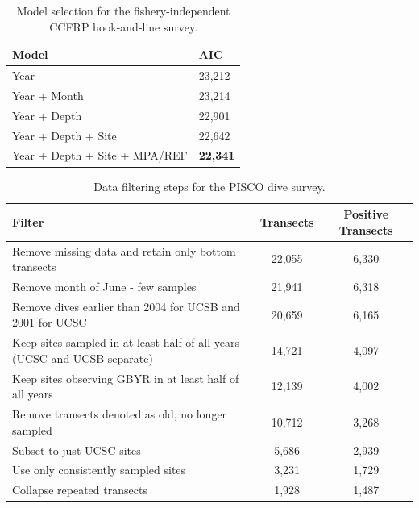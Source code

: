 \documentclass[12pt,]{article}
\begin{document}
\vspace{3cm}

\begin{table}[ht]
\centering
\caption{Model selection for the fishery-independent CCFRP hook-and-line survey.} 
\label{tab:Fleet9_AIC}
\begin{tabular}{ll}
  \hline
Model & AIC \\ 
  \hline
Year & 23,212 \\ 
  Year + Month & 23,214 \\ 
  Year + Depth & 22,901 \\ 
  Year + Depth + Site & 22,642 \\ 
  Year + Depth + Site + MPA/REF & \textbf{22,341} \\ 
   \hline
\end{tabular}
\end{table}

\FloatBarrier

\vspace{3cm}

\begin{table}[ht]
\centering
\caption{Data filtering steps for the PISCO dive survey.} 
\label{tab:Fleet8_Filter}
\begin{tabular}{>{\raggedright}p{4in}cc}
  \hline
Filter & Transects & Positive Transects \\ 
  \hline
Remove missing data and retain only bottom transects & 22,055 & 6,330 \\ 
  Remove month of  June - few samples & 21,941 & 6,318 \\ 
  Remove dives earlier than 2004 for UCSB and 2001 for UCSC & 20,659 & 6,165 \\ 
  Keep sites sampled in at least half of all years (UCSC and UCSB separate) & 14,721 & 4,097 \\ 
  Keep sites observing GBYR in at least half of all years & 12,139 & 4,002 \\ 
  Remove transects denoted as old, no longer sampled & 10,712 & 3,268 \\ 
  Subset to just UCSC sites & 5,686 & 2,939 \\ 
  Use only consistently sampled sites & 3,231 & 1,729 \\ 
  Collapse repeated transects & 1,928 & 1,487 \\ 
   \hline
\end{tabular}
\end{table}

\vspace{3cm}
\end{document}

